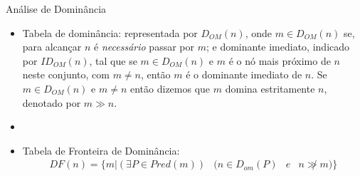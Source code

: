 \begin{frame}{Análise de Dominância}
    \begin{itemize}
        \item Tabela de dominância: representada por $D_{OM}(n)$, onde $m\in D_{OM}(n)$ se, para alcançar $n$ é \textit{necessário} passar por $m$; e dominante imediato, indicado por $ID_{OM}(n)$, tal que se $m\in D_{OM}(n)$ e $m$ é o nó mais próximo de $n$ neste conjunto, com $m \neq n$, então $m$ é o dominante imediato de $n$. Se $m \in D_{OM}(n)$ e $m\neq n$ então dizemos que $m$ domina estritamente $n$, denotado por $m\gg n$.
        \item[] 

        \item Tabela de Fronteira de Dominância: 
        \begin{equation}
            \begin{matrix}
                DF(n) = \{m | (\exists P \in Pred(m)) & (n \in D_{om}(P) & e & n \not\gg m)\}
            \end{matrix}
        \end{equation}
    \end{itemize}

\end{frame}
